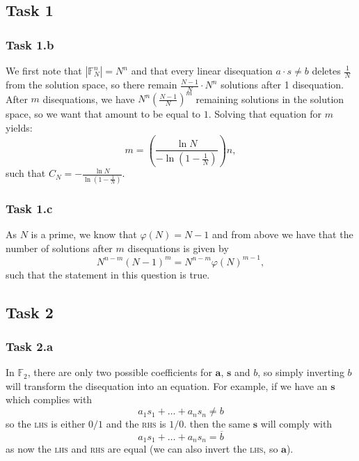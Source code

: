 \documentclass{article}
\author{Robin Martens}
\date{19/08/2023}
\begin{document}


\setcounter{page}{1}
\pagestyle{fancy}


\subsection*{Task 1}
\subsubsection*{Task 1.b}

We first note that $\left| \mathbb{F}_N^n \right|  = N^n$ and that every
linear disequation $a \cdot s \neq b$ deletes  $\frac{1}{N}$ from the solution
space, so there remain $\frac{N - 1}{N} \cdot N^n$ solutions after 1
disequation. After $m$ disequations, we have $N^n\left(\frac{N-1}{N} \right)^m 
$ remaining solutions in the solution space, so we want that amount to be equal
to $1$. Solving that equation for $m$ yields:
\begin{equation}
m = \left( \frac{\ln N}{- \ln(1 - \frac{1}{N})} \right) n,
\end{equation} 
such that $C_N = -\frac{\ln N}{\ln(1 - \frac{1}{N})}$.

\subsubsection*{Task 1.c}

As $N$ is a prime, we know that $\varphi(N) = N - 1$ and from above we have that
the number of solutions after $m$ disequations is given by 
\begin{equation}
  N^{n - m} (N - 1)^m = N^{n - m} \varphi(N)^{m - 1},
\end{equation} 
such that the statement in this question is true.


\subsection*{Task 2}
\subsubsection*{Task 2.a}

In $\mathbb{F}_2$, there are only two possible coefficients for $
\mathbf{a}$, $\mathbf{s}$ and $b$, so simply inverting $b$ will transform
the disequation into an equation. For example, if we have an $\mathbf{s}$ which
complies with 
\begin{equation}
a_1 s_1 + \dots + a_n s_n \neq b
\end{equation} 
so the \textsc{lhs} is either $0/1$ and the \textsc{rhs} is $1/0$.
then the same $\mathbf{s}$ will comply with 
\begin{equation}
  a_1 s_1 + \dots + a_n s_n = \overline{b}
\end{equation} 
as now the \textsc{lhs} and \textsc{rhs} are equal (we can also invert the
\textsc{lhs}, so $\mathbf{a}$).
\end{document}
